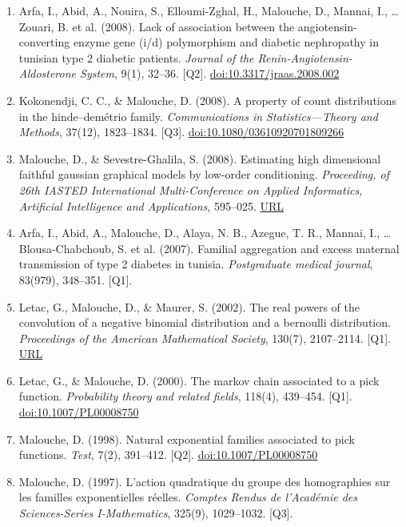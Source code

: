 \documentclass[11pt,a4paper,sans]{moderncv}
\begin{document}
\begin{enumerate}
\item Arfa, I., Abid, A., Nouira, S., Elloumi-Zghal, H., Malouche, D., Mannai, I., \ldots Zouari, B. et al. (2008). Lack of association between the angiotensin-converting enzyme gene (i/d) polymorphism and diabetic nephropathy in tunisian type 2 diabetic patients. \textit{Journal of the Renin-Angiotensin-Aldosterone System}, 9(1), 32–36. [Q2]. \href{https://doi.org/10.3317/jraas.2008.002}{doi:10.3317/jraas.2008.002}
\item Kokonendji, C. C., \& Malouche, D. (2008). A property of count distributions in the hinde–demétrio family. \textit{Communications in Statistics—Theory and Methods}, 37(12), 1823–1834. [Q3]. \href{https://doi.org/10.1080/03610920701809266}{doi:10.1080/03610920701809266}
\item Malouche, D., \& Sevestre-Ghalila, S. (2008). Estimating high dimensional faithful gaussian graphical models by low-order conditioning. \textit{Proceeding, of 26th IASTED International Multi-Conference on Applied Informatics, Artificial Intelligence and Applications}, 595–025. \href{http://citeseerx.ist.psu.edu/viewdoc/summary?doi=10.1.1.246.9608}{URL}
\item Arfa, I., Abid, A., Malouche, D., Alaya, N. B., Azegue, T. R., Mannai, I., \ldots Blousa-Chabchoub, S. et al. (2007). Familial aggregation and excess maternal transmission of type 2 diabetes in tunisia. \textit{Postgraduate medical journal}, 83(979), 348–351. [Q1].
\item Letac, G., Malouche, D., \& Maurer, S. (2002). The real powers of the convolution of a negative binomial distribution and a bernoulli distribution. \textit{Proceedings of the American Mathematical Society}, 130(7), 2107–2114. [Q1]. \href{https://www.ams.org/journals/proc/2002-130-07/S0002-9939-02-05352-2/}{URL}
\item Letac, G., \& Malouche, D. (2000). The markov chain associated to a pick function. \textit{Probability theory and related fields}, 118(4), 439–454. [Q1]. \href{https://link.springer.com/article/10.1007/PL00008750}{doi:10.1007/PL00008750}
\item Malouche, D. (1998). Natural exponential families associated to pick functions. \textit{Test}, 7(2), 391–412. [Q2]. \href{https://doi.org/10.1007/PL00008750}{doi:10.1007/PL00008750}
\item Malouche, D. (1997). L'action quadratique du groupe des homographies sur les familles exponentielles réelles. \textit{Comptes Rendus de l'Académie des Sciences-Series I-Mathematics}, 325(9), 1029–1032. [Q3].
\end{enumerate}
\end{document}
